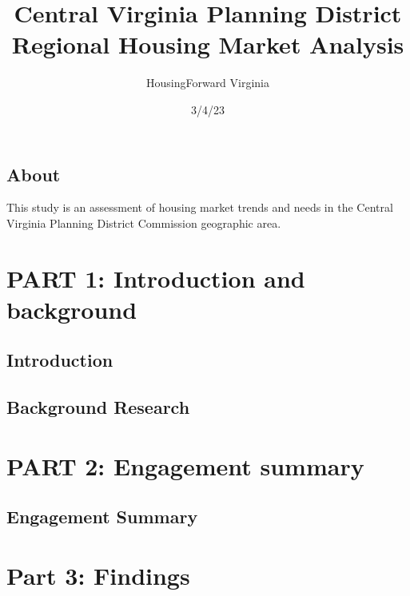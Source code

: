 \documentclass[
  letterpaper,
  DIV=11,
  numbers=noendperiod]{scrreprt}
\title{Central Virginia Planning District Regional Housing Market
Analysis}
\author{HousingForward Virginia}
\date{3/4/23}
\renewcommand*\contentsname{Table of contents}
\newcommand\contentsname{Table of contents}
\begin{document}
\maketitle
\ifdefined\Shaded\renewenvironment{Shaded}{\begin{tcolorbox}[sharp corners, interior hidden, borderline west={3pt}{0pt}{shadecolor}, enhanced, boxrule=0pt, frame hidden, breakable]}{\end{tcolorbox}}\fi

\renewcommand*\contentsname{Table of contents}
{
\hypersetup{linkcolor=}
\setcounter{tocdepth}{2}
\tableofcontents
}

\hypertarget{about}{%
\chapter{About}\label{about}}

This study is an assessment of housing market trends and needs in the
Central Virginia Planning District Commission geographic area.

\part{PART 1: Introduction and background}

\hypertarget{introduction}{%
\chapter{Introduction}\label{introduction}}

\hypertarget{background-research}{%
\chapter{Background Research}\label{background-research}}

\part{PART 2: Engagement summary}

\hypertarget{engagement-summary}{%
\chapter{Engagement Summary}\label{engagement-summary}}

\part{Part 3: Findings}
\end{document}
